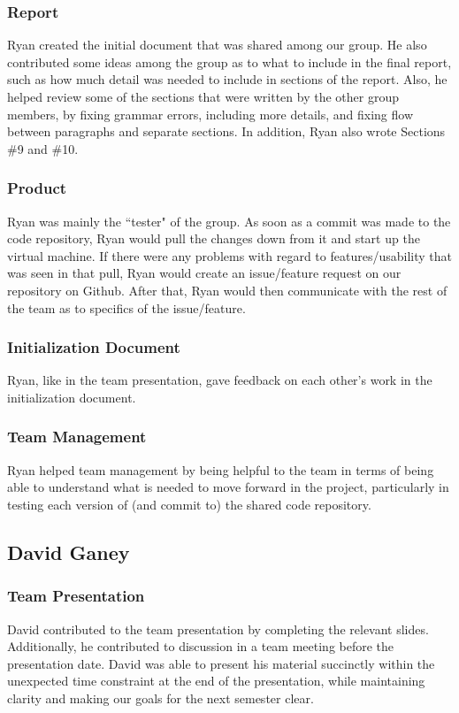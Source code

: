 \documentclass[12pt]{article}
\begin{document}
\begin{spacing}{1.5}
\subsubsection{Report}
Ryan created the initial document that was shared among our group. He also contributed some ideas among the group as to what to include in the final report, such as how much detail was needed to include in sections of the report. Also, he helped review some of the sections that were written by the other group members, by fixing grammar errors, including more details, and fixing flow between paragraphs and separate sections. In addition, Ryan also wrote Sections \#9 and \#10.
\subsubsection{Product}
Ryan was mainly the ``tester" of the group. As soon as a commit was made to the code repository, Ryan would pull the changes down from it and start up the virtual machine. If there were any problems with regard to features/usability that was seen in that pull, Ryan would create an issue/feature request on our repository on Github. After that, Ryan would then communicate with the rest of the team as to specifics of the issue/feature.
\subsubsection{Initialization Document}
Ryan, like in the team presentation, gave feedback on each other's work in the initialization document. 
\subsubsection{Team Management}
Ryan helped team management by being helpful to the team in terms of being able to understand what is needed to move forward in the project, particularly in testing each version of (and commit to) the shared code repository. 

\clearpage

\subsection{David Ganey}
\subsubsection{Team Presentation}
David contributed to the team presentation by completing the relevant slides. Additionally, he contributed to discussion in a team meeting before the presentation date. David was able to present his material succinctly within the unexpected time constraint at the end of the presentation, while maintaining clarity and making our goals for the next semester clear.

\end{spacing}
\end{document}
